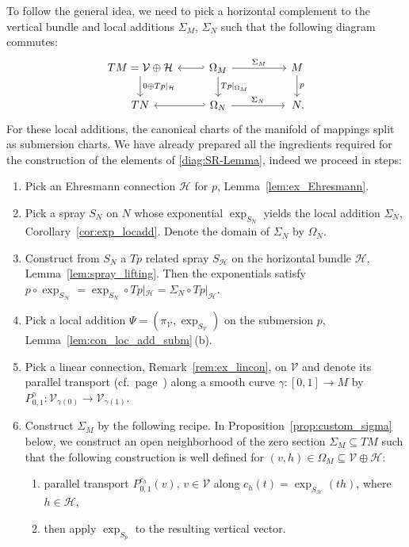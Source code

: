 \documentclass[pdftex]{sigma}
\numberwithin{equation}{section}
\newcommand{\cH}{\ensuremath{\mathcal{H}}}
\newcommand{\cV}{\ensuremath{\mathcal{V}}}
\begin{document}
To follow the general idea, we need to pick a horizontal complement to the vertical bundle and local additions $\Sigma_M$, $\Sigma_N$ such that the following diagram commutes:
\begin{equation}\label{diag:SR-Lemma}
\begin{tikzcd}
 TM=\mathcal{V} \oplus \mathcal{H} \arrow[d, ,"0\oplus Tp|_{\mathcal{H}}"] & \arrow[l,hook'] \Omega_M \arrow[rr,"\Sigma_M"] \arrow[d,"Tp|_{\Omega_M}"] & &M \arrow[d,"p"]\\ TN & \arrow[l, hook'] \Omega_N \arrow[rr,"\Sigma_N"] & &\,N.
\end{tikzcd}
\end{equation}
For these local additions, the canonical charts of the manifold of mappings split as submersion charts.
We have already prepared all the ingredients required for the construction of the elements of \eqref{diag:SR-Lemma}, indeed we proceed in steps:
\begin{enumerate}\itemsep=0pt
\item Pick an Ehresmann connection $\cH$ for $p$, Lemma~\ref{lem:ex_Ehresmann}.
\item Pick a spray $S_N$ on $N$ whose exponential $\exp_{S_N}$ yields the local addition $\Sigma_N$, Corollary~\ref{cor:exp_locadd}. Denote the domain of $\Sigma_N$ by $\Omega_N$.
\item Construct from $S_N$ a $Tp$ related spray $S_\cH$ on the horizontal bundle $\cH$, Lemma~\ref{lem:spray_lifting}. Then the exponentials satisfy $p \circ \exp_{S_\cH} = \exp_{S_N} \circ Tp|_\cH = \Sigma_N \circ Tp|_{\cH}.$
\item Pick a local addition $\Psi=(\pi_{\cV},\exp_{S_{\cV}})$ on the submersion $p$, Lemma~\ref{lem:con_loc_add_subm}\,(b).
\item Pick a linear connection, Remark~\ref{rem:ex_lincon}, on $\cV$ and denote its parallel transport (cf.\ page~\pageref{setup:parallel_tp}) along a smooth curve $\gamma \colon [0,1] \rightarrow M$ by $P^\gamma_{0,1}\colon \cV_{\gamma(0)} \rightarrow \cV_{\gamma(1)}$.
\item Construct $\Sigma_M$ by the following recipe. In Proposition~\ref{prop:custom_sigma} below, we construct an open neighborhood of the zero section $\Sigma_M \subseteq TM$ such that the following construction is well defined for $(v,h) \in \Omega_M \subseteq \cV \oplus \cH$:
\begin{enumerate}\itemsep=0pt
\item parallel transport $P_{0,1}^{c_h}(v)$, $v\in \cV$ along $c_h(t)=\exp_{S_\cH}(th)$, where $h \in \cH$,
\item then apply $\exp_{S_p}$ to the resulting vertical vector.
\end{enumerate}
\end{enumerate}
\end{document}

